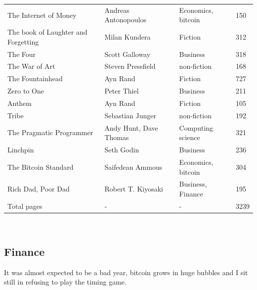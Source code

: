 \documentclass[a4paper]{article}
\begin{document}
	\begin{tabular}{l|l|l|l}
		The Internet of Money & Andreas Antonopoulos & Economics, bitcoin & 150 \\
		The book of Laughter and Forgetting & Milan Kundera & Fiction & 312 \\
		The Four & Scott Galloway & Business & 318 \\
		The War of Art & Steven Pressfield & non-fiction & 168 \\
		The Fountainhead & Ayn Rand & Fiction & 727 \\
		Zero to One & Peter Thiel & Business & 211 \\
		Anthem & Ayn Rand & Fiction & 105 \\
		Tribe & Sebastian Junger & non-fiction & 192 \\
		The Pragmatic Programmer & Andy Hunt, Dave Thomas & Computing science & 321 \\
		Linchpin & Seth Godin & Business & 236 \\
		The Bitcoin Standard & Saifedean Ammous & Economics, bitcoin & 304 \\
		Rich Dad, Poor Dad & Robert T. Kiyosaki & Business, Finance & 195 \\ 
		
		Total pages & - & - & 3239
	\end{tabular} \\
	
	\subsection{Finance}
	
	It was almost expected to be a bad year, bitcoin grows in huge bubbles and I sit still in refusing to play the timing game.
	
\end{document}
